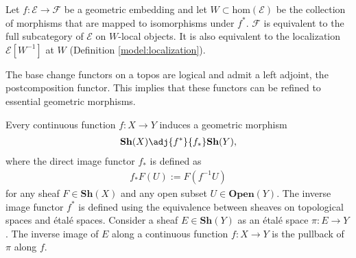     \begin{property}\label{topos:characterization_embedding}
        Let $f:\mathcal{E}\rightarrow\mathcal{F}$ be a geometric embedding and let $W\subset\mathrm{hom}(\mathcal{E})$ be the collection of morphisms that are mapped to isomorphisms under $f^*$. $\mathcal{F}$ is equivalent to the full subcategory of $\mathcal{E}$ on $W$-local objects. It is also equivalent to the localization $\mathcal{E}[W^{-1}]$ at $W$ (Definition \ref{model:localization}).
    \end{property}

    \begin{property}
        The base change functors on a topos are logical and admit a left adjoint, the postcomposition functor. This implies that these functors can be refined to essential geometric morphisms.
    \end{property}

    \begin{example}\label{topos:topological_spaces}
        Every continuous function $f:X\rightarrow Y$ induces a geometric morphism
        \begin{gather}
            \mathbf{Sh}(X)\adj{f^*}{f_*}\mathbf{Sh}(Y),
        \end{gather}
        where the direct image functor $f_*$ is defined as
        \begin{gather}
            f_*F(U) := F(f^{-1}U)
        \end{gather}
        for any sheaf $F\in\mathbf{Sh}(X)$ and any open subset $U\in\mathbf{Open}(Y)$. The inverse image functor $f^*$ is defined using the equivalence between sheaves on topological spaces and \'etal\'e spaces. Consider a sheaf $E\in\mathbf{Sh}(Y)$ as an \'etal\'e space $\pi:E\rightarrow Y$. The inverse image of $E$ along a continuous function $f:X\rightarrow Y$ is the pullback of $\pi$ along $f$.
    \end{example}

